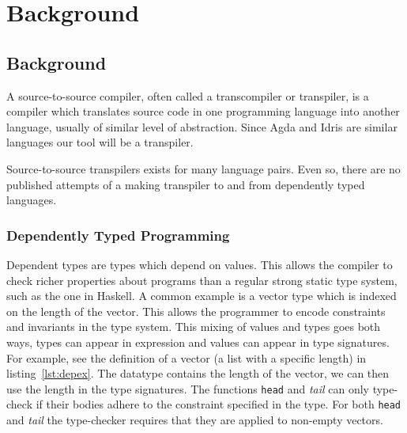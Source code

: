 \chapter{Background}


\section{Background}

A source-to-source compiler, often called a transcompiler or transpiler, is
a compiler which translates source code in one programming language into
another language, usually of similar level of abstraction.
Since Agda and Idris are similar languages our tool will be a transpiler.

Source-to-source transpilers exists for many language pairs. Even so, there are
no published attempts of a making transpiler to and from dependently
typed languages.




\subsection{Dependently Typed Programming}

Dependent types are types which depend on values.
This allows the compiler to check richer properties about programs than
a regular strong static type system, such as the one in Haskell.
A common example is a vector type which is indexed on the length of
the vector. This allows the programmer to encode constraints and invariants in
the type system.
This mixing of values and types goes both ways, types can appear in expression
and values can appear in type signatures.
For example, see the definition of a vector (a list with a specific length) in
listing~\ref{lst:depex}. The datatype contains the length of the vector, we can
then use the length in the type signatures.
The functions \texttt{head} and \textit{tail} can only type-check if their
bodies adhere to the constraint specified in the type.
For both \texttt{head} and \textit{tail} the type-checker requires that they
are applied to non-empty vectors.


